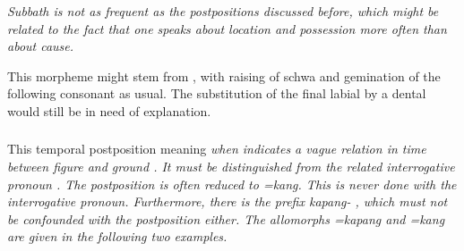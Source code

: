 

\em Subbath \em is not as frequent as the postpositions discussed before, which might be related to the fact that one speaks about location and possession more often than about cause.

This morpheme might stem from   \citep[35]{Adelaar1985}, with raising of schwa and gemination of the following consonant as usual. The substitution of the final labial by a dental would still be in need of explanation.

% 


% 
%  


\subsubsection{}\label{sec:morph:=kapang}
This temporal postposition meaning \em when \em indicates a vague relation in time between figure and ground . It must be distinguished from the related interrogative pronoun  .   The postposition is often reduced to   \em =kang\em. This is never done with the interrogative pronoun.  Furthermore, there is the prefix \em kapang- \em {}, which must not be confounded with the postposition either. The allomorphs \em =kapang \em and \em =kang \em are given in the following two examples.


